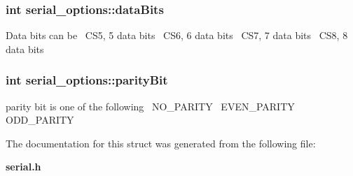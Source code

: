 \subsubsection[{data\+Bits}]{\setlength{\rightskip}{0pt plus 5cm}int serial\+\_\+options\+::data\+Bits}\label{structserial__options_a8cf428ea4d6bd82249b191c18574da5e}
Data bits can be~\newline
 C\+S5, 5 data bits~\newline
 C\+S6, 6 data bits~\newline
 C\+S7, 7 data bits~\newline
 C\+S8, 8 data bits~\newline
\subsubsection[{parity\+Bit}]{\setlength{\rightskip}{0pt plus 5cm}int serial\+\_\+options\+::parity\+Bit}\label{structserial__options_a872c4f9a94607d8b16de115735967e53}
parity bit is one of the following~\newline
 N\+O\+\_\+\+P\+A\+R\+I\+TY~\newline
 E\+V\+E\+N\+\_\+\+P\+A\+R\+I\+TY~\newline
 O\+D\+D\+\_\+\+P\+A\+R\+I\+TY~\newline
 

The documentation for this struct was generated from the following file\+:\begin{DoxyCompactItemize}
\item 
{\bf serial.\+h}\end{DoxyCompactItemize}
